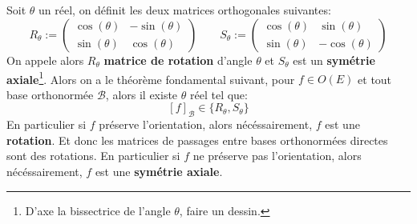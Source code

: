 \subsection*{}
Soit \(\theta\) un réel, on définit les deux matrices orthogonales suivantes:
\[
   R_\theta := \begin{pmatrix}
      \cos(\theta) & -\sin(\theta) \\
      \sin(\theta) & \cos(\theta)
   \end{pmatrix} \quad\quad 
   S_\theta := \begin{pmatrix}
      \cos(\theta) & \sin(\theta) \\
      \sin(\theta) & -\cos(\theta)
   \end{pmatrix}  
\]
On appele alors \(R_\theta\) \textbf{matrice de rotation} d'angle \(\theta\) et \(S_\theta\) est un \textbf{symétrie axiale}\footnote[1]{D'axe la bissectrice de l'angle \(\theta\), faire un dessin.}.
Alors on a le théorème fondamental suivant, pour \(f \in O(E)\) et tout base orthonormée \(\mathscr{B}\), alors il existe \(\theta\) réel tel que:
\[
   [f]_\mathscr{B} \in \bigl\{ R_\theta, S_\theta \bigl\}   
\]
En particulier si \(f\) préserve l'orientation, alors nécéssairement, \(f\) est une \textbf{rotation}. Et donc les matrices de passages entre bases orthonormées directes sont des rotations.\+
En particulier si \(f\) ne préserve pas l'orientation, alors nécéssairement, \(f\) est une \textbf{symétrie axiale}.

